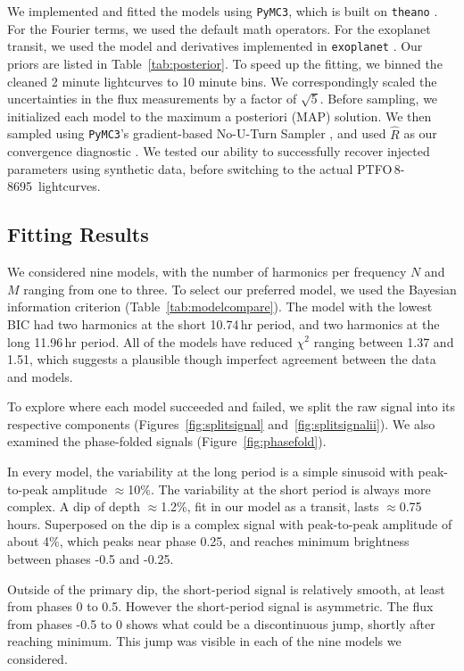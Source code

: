 \documentclass[12pt,twocolumn,tighten]{aastex62}
\newcommand{\ptfo}{PTFO$\,$8-8695}
\begin{document}
We implemented and fitted the models using \texttt{PyMC3}, which is
built on \texttt{theano}
\citep{salvatier_2016_PyMC3,exoplanet:theano}.  For the Fourier terms,
we used the default math operators.  For the exoplanet transit, we
used the model and derivatives implemented in \texttt{exoplanet}
\citep{exoplanet:exoplanet}.  Our priors are listed in
Table~\ref{tab:posterior}.  To speed up the fitting, we binned the
cleaned 2 minute lightcurves to 10 minute bins.  We correspondingly
scaled the uncertainties in the flux measurements by a factor of
$\sqrt{5}$.  Before sampling, we initialized each model to the maximum
a posteriori (MAP) solution.  We then sampled using \texttt{PyMC3}'s
gradient-based No-U-Turn Sampler \citep{hoffman_no-u-turn_2014}, and
used $\hat{R}$ as our convergence diagnostic
\citep{gelman_inference_1992}.
We tested our ability to successfully recover injected parameters
using synthetic data, before switching to the actual \ptfo\
lightcurves.


\subsection{Fitting Results}

We considered nine models, with the number of harmonics per frequency
$N$ and $M$ ranging from one to three.  To select our preferred model,
we used the Bayesian information criterion
(Table~\ref{tab:modelcompare}).  The model with the lowest BIC had
two harmonics at the short 10.74$\,$hr period, and two harmonics
at the long 11.96$\,$hr period.  All of the models have reduced
$\chi^2$ ranging between 1.37 and 1.51, which suggests a plausible
though imperfect agreement between the data and models.

To explore where each model succeeded and failed, we split the raw
signal into its respective components (Figures~\ref{fig:splitsignal}
and~\ref{fig:splitsignalii}).  We also examined the phase-folded
signals (Figure~\ref{fig:phasefold}).  

In every model, the variability at the long period is a simple
sinusoid with peak-to-peak amplitude $\approx$10\%.  The variability
at the short period is always more complex.  A dip of depth
$\approx$1.2\%, fit in our model as a transit, lasts $\approx$0.75
hours.  Superposed on the dip is a complex signal with peak-to-peak
amplitude of about 4\%, which peaks near phase 0.25, and reaches
minimum brightness between phases -0.5 and -0.25.

Outside of the primary dip, the short-period signal is relatively
smooth, at least from phases 0 to 0.5.  However the short-period
signal is asymmetric.  The flux from phases -0.5 to 0 shows what could
be a discontinuous jump, shortly after reaching minimum.  This jump
was visible in each of the nine models we considered.
\end{document}
